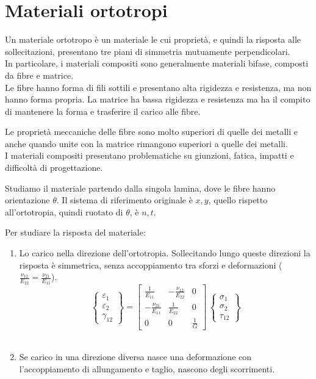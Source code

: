 \section{Materiali ortotropi}

Un materiale ortotropo è un materiale le cui proprietà, e quindi la risposta alle sollecitazioni, presentano tre piani di simmetria mutuamente perpendicolari.\\
In particolare, i materiali compositi sono generalmente materiali bifase, composti da fibre e matrice.\\
Le fibre hanno forma di fili sottili e presentano alta rigidezza e resistenza, ma non hanno forma propria. La matrice ha bassa rigidezza e resistenza ma ha il compito di mantenere la forma e trasferire il carico alle fibre.

Le proprietà meccaniche delle fibre sono molto superiori di quelle dei metalli e anche quando unite con la matrice rimangono superiori a quelle dei metalli.\\
I materiali compositi presentano problematiche su giunzioni, fatica, impatti e difficoltà di progettazione.

Studiamo il materiale partendo dalla singola lamina, dove le fibre hanno orientazione $\theta$. Il sistema di riferimento originale è $x, y$, quello rispetto all'ortotropia, quindi ruotato di   $\theta$, è $n, t$.

Per studiare la risposta del materiale:
\begin{enumerate}
    \item Lo carico nella direzione dell'ortotropia. Sollecitando lungo queste direzioni la risposta è simmetrica, senza accoppiamento tra sforzi e deformazioni ($\frac{\nu_{12}}{E_{22}}=\frac{\nu_{21}}{E_{11}}$).
    \begin{equation*}
\left\{
\begin{array}{c}
\varepsilon_{1} \\
\varepsilon_{2} \\
\gamma_{12}
\end{array}
\right\}
=
\left[
\begin{array}{ccc}
\displaystyle \frac{1}{E_{11}} & \displaystyle-\frac{\nu_{12}}{E_{22}} & 0\\
\displaystyle -\frac{\nu_{21}}{E_{11}} & \displaystyle\frac{1}{E_{22}} &0 \\
0& 0 & \displaystyle\frac{1}{G}
\end{array}
\right]\,
\left\{
\begin{array}{c}
\sigma_{1} \\
\sigma_{2} \\
\tau_{12}
\end{array}
\right\}
\end{equation*}
    \\
    \item Se carico in una direzione diversa nasce una deformazione con l'accoppiamento di allungamento e taglio, nascono degli scorrimenti.
\end{enumerate}

